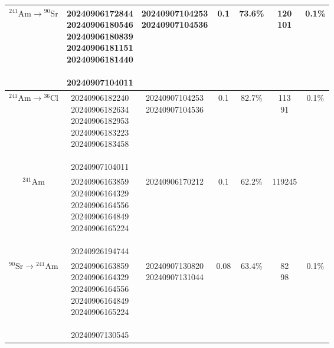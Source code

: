 \begin{longtable}{c c c c c c c}
    \endlastfoot
    $\mathrm{^{241}Am}\rightarrow\mathrm{^{90}Sr}$  &   \makecell[c]{20240906172844 \\ 20240906180546 \\ 20240906180839 \\ 20240906181151 \\  20240906181440 \\ \\ 20240907104011}  &   \makecell[c]{20240907104253 \\ 20240907104536} &   0.1    &   73.6\%  &   \makecell[c]{120 \\ 101}  &   0.1\%   \\
    \midrule
    $\mathrm{^{241}Am}\rightarrow\mathrm{^{36}Cl}$  &   \makecell[c]{20240906182240 \\ 20240906182634 \\ 20240906182953 \\ 20240906183223 \\ 20240906183458 \\ \\ 20240907104011}  & \makecell[c]{20240907104253 \\ 20240907104536} &   0.1 &   82.7\%  &   \makecell[c]{113 \\ 91} &   0.1\%   \\
    \midrule
    $\mathrm{^{241}Am}$ &   \makecell[c]{20240906163859 \\ 20240906164329 \\ 20240906164556 \\ 20240906164849 \\ 20240906165224 \\ \\ 20240926194744} & 20240906170212  &   0.1 &   62.2\%  &   119245  &   \\
    \midrule
    $\mathrm{^{90}Sr}\rightarrow\mathrm{^{241}Am}$  &   \makecell[c]{20240906163859 \\ 20240906164329 \\ 20240906164556 \\ 20240906164849 \\ 20240906165224 \\ \\ 20240907130545}   &   \makecell[c]{20240907130820 \\ 20240907131044}  &   0.08    &   63.4\%  &   \makecell[c]{82 \\ 98}  &   0.1\%   \\

\end{longtable}
